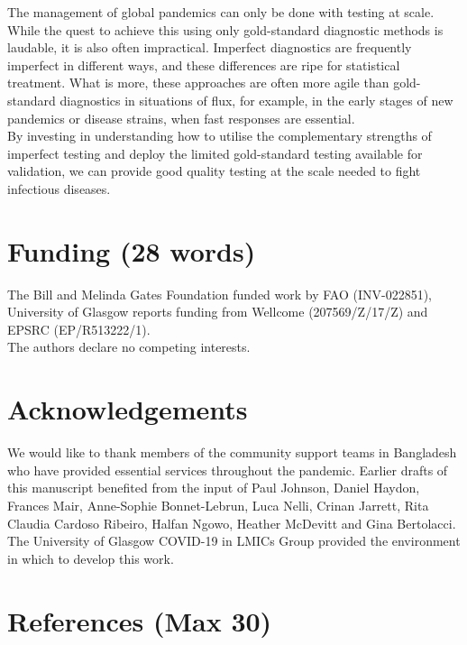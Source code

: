 \documentclass[]{elsarticle} %
\begin{document}
The management of global pandemics can only be done with testing at scale.
While the quest to achieve this using only gold-standard diagnostic methods is laudable, it is also often impractical.
Imperfect diagnostics are frequently imperfect in different ways, and these differences are ripe for statistical treatment.
What is more, these approaches are often more agile than gold-standard diagnostics in situations of flux, for example, in the early stages of new pandemics or disease strains, when fast responses are essential.\\
By investing in understanding how to utilise the complementary strengths of imperfect testing and deploy the limited gold-standard testing available for validation, we can provide good quality testing at the scale needed to fight infectious diseases.

\hypertarget{funding-28-words}{%
\section{Funding (28 words)}\label{funding-28-words}}

The Bill and Melinda Gates Foundation funded work by FAO (INV-022851), University of Glasgow reports funding from Wellcome (207569/Z/17/Z) and EPSRC (EP/R513222/1).\\
The authors declare no competing interests.

\hypertarget{acknowledgements}{%
\section{Acknowledgements}\label{acknowledgements}}

We would like to thank members of the community support teams in Bangladesh who have provided essential services throughout the pandemic.
Earlier drafts of this manuscript benefited from the input of Paul Johnson, Daniel Haydon, Frances Mair, Anne-Sophie Bonnet-Lebrun, Luca Nelli, Crinan Jarrett, Rita Claudia Cardoso Ribeiro, Halfan Ngowo, Heather McDevitt and Gina Bertolacci.
The University of Glasgow COVID-19 in LMICs Group provided the environment in which to develop this work.

\hypertarget{references-max-30}{%
\section*{References (Max 30)}\label{references-max-30}}
\end{document}
